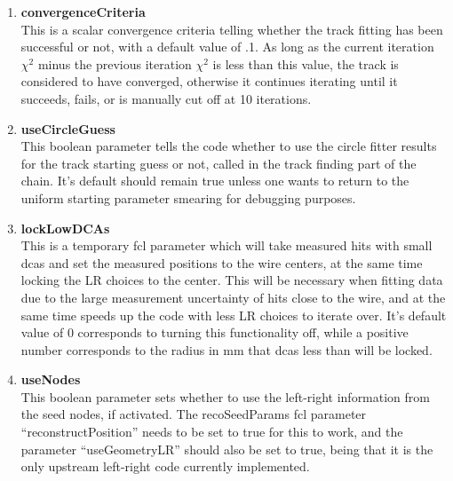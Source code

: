 \documentclass{article}
\begin{document}
\begin{enumerate}
      \item{\bf{convergenceCriteria}} \\
      This is a scalar convergence criteria telling whether the track fitting has been successful or not, with a default value of .1. As long as the current iteration $\chi^{2}$ minus the previous iteration $\chi^{2}$ is less than this value, the track is considered to have converged, otherwise it continues iterating until it succeeds, fails, or is manually cut off at 10 iterations.

      \item{\bf{useCircleGuess}} \\
      This boolean parameter tells the code whether to use the circle fitter results for the track starting guess or not, called in the track finding part of the chain. It's default should remain true unless one wants to return to the uniform starting parameter smearing for debugging purposes.

      \item{\bf{lockLowDCAs}} \\
      This is a temporary fcl parameter which will take measured hits with small dcas and set the measured positions to the wire centers, at the same time locking the LR choices to the center. This will be necessary when fitting data due to the large measurement uncertainty of hits close to the wire, and at the same time speeds up the code with less LR choices to iterate over. It's default value of 0 corresponds to turning this functionality off, while a positive number corresponds to the radius in mm that dcas less than will be locked.

      \item{\bf{useNodes}} \\
      This boolean parameter sets whether to use the left-right information from the seed nodes, if activated. The recoSeedParams fcl parameter ``reconstructPosition'' needs to be set to true for this to work, and the parameter ``useGeometryLR'' should also be set to true, being that it is the only upstream left-right code currently implemented.


\end{enumerate}
\end{document}
